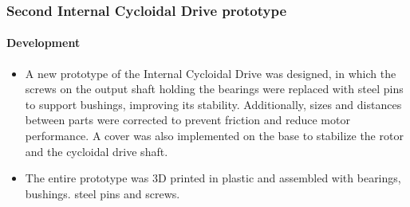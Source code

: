 \documentclass{article}
\begin{document}
\subsubsection{Second \textbf{Internal} Cycloidal Drive prototype}
\paragraph[short]{Development}
\begin{itemize}
    \item A new prototype of the Internal Cycloidal Drive was designed, in which the screws on the output shaft holding the bearings were replaced with steel pins to support bushings, improving its stability. Additionally, sizes and distances between parts were corrected to prevent friction and reduce motor performance. A cover was also implemented on the base to stabilize the rotor and the cycloidal drive shaft.
    \item The entire prototype was 3D printed in plastic and assembled with bearings, bushings. steel pins and screws.
    
\end{itemize}
\end{document}

